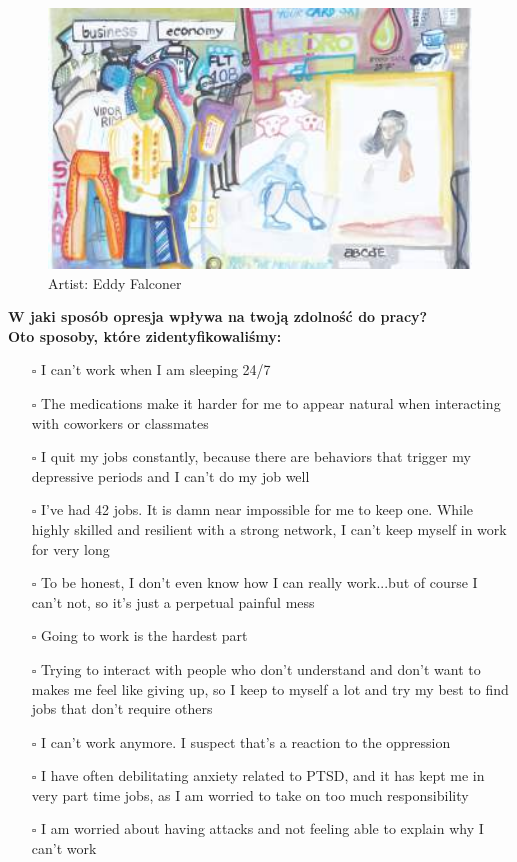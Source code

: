 \newpage
\begin{figure}[h]
\centering
\includegraphics[width=16cm]{TeX_files/2-3.png}
\caption{Artist: Eddy Falconer}
\label{2-2}
\end{figure}

\noindent\textcolor{ProcessBlue}{\textbf{\Large{W jaki sposób opresja wpływa na twoją zdolność do pracy?}}}\\
\textbf{\large{Oto sposoby, które zidentyfikowaliśmy:}}
\begin{multicols}{2}
\begin{itemize}
\item[$\square$]{I can’t work when I am sleeping 24/7}
\item[$\square$]{The medications make it harder for me to appear natural when interacting with coworkers or classmates}
\item[$\square$]{I quit my jobs constantly, because there are behaviors that trigger my depressive periods and I can’t do my job well}
\item[$\square$]{I’ve had 42 jobs. It is damn near impossible for me to keep one. While highly skilled and resilient with a strong network, I can’t keep myself in work for very long}
\item[$\square$]{To be honest, I don’t even know how I can really work...but of course I can’t not, so it’s just a perpetual painful mess}
\item[$\square$]{Going to work is the hardest part}
\item[$\square$]{Trying to interact with people who don’t understand and don’t want to makes me feel like giving up, so I keep to myself a lot and try my best to find jobs that don’t require others}
\item[$\square$]{I can’t work anymore. I suspect that’s a reaction to the oppression}
\item[$\square$]{I have often debilitating anxiety related to PTSD, and it has kept me in very part time jobs, as I am worried to take on too much responsibility}
\item[$\square$]{I am worried about having attacks and not feeling able to explain why I can’t work}
\end{itemize}
\end{multicols}


